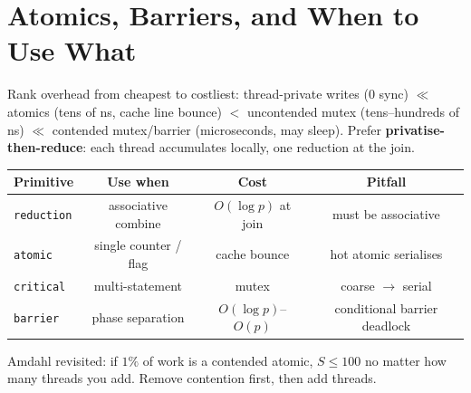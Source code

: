 \section{Atomics, Barriers, and When to Use What}
Rank overhead from cheapest to costliest: thread-private writes ($0$ sync) $\ll$ atomics (tens of ns, cache line bounce) $<$ uncontended mutex (tens--hundreds of ns) $\ll$ contended mutex/barrier (microseconds, may sleep). Prefer \textbf{privatise-then-reduce}: each thread accumulates locally, one reduction at the join.

\begin{center}\small\begin{tabular}{lccc}
\toprule Primitive & Use when & Cost & Pitfall \\ \midrule
\texttt{reduction} & associative combine & $O(\log p)$ at join & must be associative \\
\texttt{atomic} & single counter / flag & cache bounce & hot atomic serialises \\
\texttt{critical} & multi-statement & mutex & coarse $\to$ serial \\
\texttt{barrier} & phase separation & $O(\log p)$--$O(p)$ & conditional barrier deadlock \\
\bottomrule
\end{tabular}\end{center}

Amdahl revisited: if $1\%$ of work is a contended atomic, $S\le100$ no matter how many threads you add. Remove contention first, then add threads.

